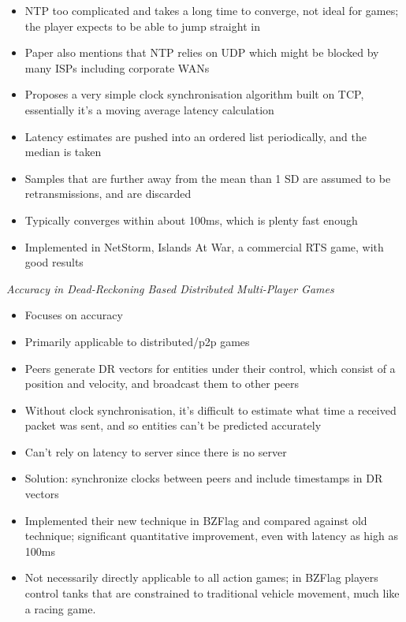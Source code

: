 \documentclass[conference]{IEEEtran}
\begin{document}
	\begin{itemize}
		\item NTP too complicated and takes a long time to converge, not ideal for games; the player expects to be able to jump straight in
		\item Paper also mentions that NTP relies on UDP which might be blocked by many ISPs including corporate WANs
		\item Proposes a very simple clock synchronisation algorithm built on TCP, essentially it's a moving average latency calculation
		\item Latency estimates are pushed into an ordered list periodically, and the median is taken
		\item Samples that are further away from the mean than 1 SD are assumed to be retransmissions, and are discarded
		\item Typically converges within about 100ms, which is plenty fast enough
		\item Implemented in NetStorm, Islands At War, a commercial RTS game, with good results
	\end{itemize}

	\emph{Accuracy in Dead-Reckoning Based Distributed Multi-Player Games}

	\begin{itemize}
		\item Focuses on accuracy
		\item Primarily applicable to distributed/p2p games
		\item Peers generate DR vectors for entities under their control, which consist of a position and velocity, and broadcast them to other peers
		\item Without clock synchronisation, it's difficult to estimate what time a received packet was sent, and so entities can't be predicted accurately
		\item Can't rely on latency to server since there is no server
		\item Solution: synchronize clocks between peers and include timestamps in DR vectors
		\item Implemented their new technique in BZFlag and compared against old technique; significant quantitative improvement, even with latency as high as 100ms
		\item Not necessarily directly applicable to all action games; in BZFlag players control tanks that are constrained to traditional vehicle movement, much like a racing game.
	\end{itemize}
\end{document}
